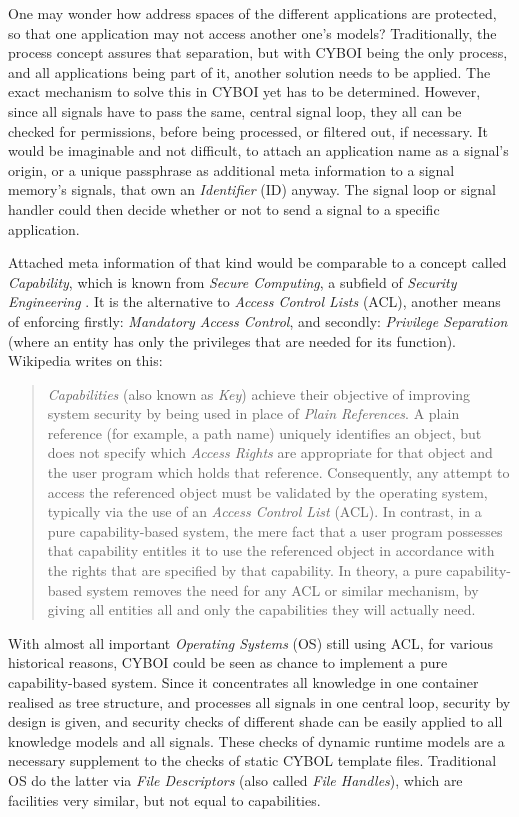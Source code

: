 One may wonder how address spaces of the different applications are protected,
so that one application may not access another one's models? Traditionally, the
process concept assures that separation, but with CYBOI being the only process,
and all applications being part of it, another solution needs to be applied.
The exact mechanism to solve this in CYBOI yet has to be determined. However,
since all signals have to pass the same, central signal loop, they all can be
checked for permissions, before being processed, or filtered out, if necessary.
It would be imaginable and not difficult, to attach an application name as a
signal's origin, or a unique passphrase as additional meta information to a
signal memory's signals, that own an \emph{Identifier} (ID) anyway. The signal
loop or signal handler could then decide whether or not to send a signal to a
specific application.

Attached meta information of that kind would be comparable to a concept called
\emph{Capability}, which is known from \emph{Secure Computing}, a subfield of
\emph{Security Engineering} \cite{wikipedia}. It is the alternative to
\emph{Access Control Lists} (ACL), another means of enforcing firstly:
\emph{Mandatory Access Control}, and secondly: \emph{Privilege Separation}
(where an entity has only the privileges that are needed for its function).
Wikipedia \cite{wikipedia} writes on this:

\begin{quote}
    \emph{Capabilities} (also known as \emph{Key}) achieve their objective of
    improving system security by being used in place of \emph{Plain References}.
    A plain reference (for example, a path name) uniquely identifies an object,
    but does not specify which \emph{Access Rights} are appropriate for that
    object and the user program which holds that reference. Consequently, any
    attempt to access the referenced object must be validated by the operating
    system, typically via the use of an \emph{Access Control List} (ACL). In
    contrast, in a pure capability-based system, the mere fact that a user
    program possesses that capability entitles it to use the referenced object
    in accordance with the rights that are specified by that capability. In
    theory, a pure capability-based system removes the need for any ACL or
    similar mechanism, by giving all entities all and only the capabilities
    they will actually need.
\end{quote}

With almost all important \emph{Operating Systems} (OS) still using ACL, for
various historical reasons, CYBOI could be seen as chance to implement a pure
capability-based system. Since it concentrates all knowledge in one container
realised as tree structure, and processes all signals in one central loop,
security by design is given, and security checks of different shade can be
easily applied to all knowledge models and all signals. These checks of dynamic
runtime models are a necessary supplement to the checks of static CYBOL template
files. Traditional OS do the latter via \emph{File Descriptors} (also called
\emph{File Handles}), which are facilities very similar, but not equal to
capabilities.

